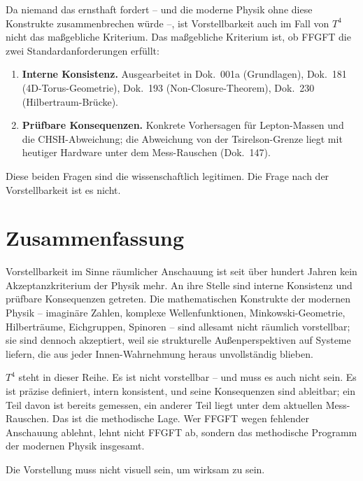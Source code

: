 Da niemand das ernsthaft fordert -- und die moderne Physik ohne diese
Konstrukte zusammenbrechen würde --, ist Vorstellbarkeit auch im Fall
von $T^4$ nicht das maßgebliche Kriterium. Das maßgebliche Kriterium
ist, ob FFGFT die zwei Standardanforderungen erfüllt:

\begin{enumerate}[leftmargin=2em,itemsep=2pt,topsep=2pt]
  \item \textbf{Interne Konsistenz.} Ausgearbeitet in
        Dok.~001a (Grundlagen), Dok.~181 (4D-Torus-Geometrie),
        Dok.~193 (Non-Closure-Theorem), Dok.~230
        (Hilbertraum-Brücke).
  \item \textbf{Prüfbare Konsequenzen.} Konkrete Vorhersagen für
        Lepton-Massen und die CHSH-Abweichung; die Abweichung von der
        Tsirelson-Grenze liegt mit heutiger Hardware unter dem
        Mess-Rauschen (Dok.~147).
\end{enumerate}

Diese beiden Fragen sind die wissenschaftlich legitimen. Die Frage
nach der Vorstellbarkeit ist es nicht.

\section{Zusammenfassung}

Vorstellbarkeit im Sinne räumlicher Anschauung ist seit über hundert
Jahren kein Akzeptanzkriterium der Physik mehr. An ihre Stelle sind
interne Konsistenz und prüfbare Konsequenzen getreten. Die
mathematischen Konstrukte der modernen Physik -- imaginäre Zahlen,
komplexe Wellenfunktionen, Minkowski-Geometrie, Hilberträume,
Eichgruppen, Spinoren -- sind allesamt nicht räumlich vorstellbar;
sie sind dennoch akzeptiert, weil sie strukturelle Außenperspektiven
auf Systeme liefern, die aus jeder Innen-Wahrnehmung heraus
unvollständig blieben.

$T^4$ steht in dieser Reihe. Es ist nicht vorstellbar -- und muss es
auch nicht sein. Es ist präzise definiert, intern konsistent, und
seine Konsequenzen sind ableitbar; ein Teil davon ist bereits
gemessen, ein anderer Teil liegt unter dem aktuellen Mess-Rauschen.
Das ist die methodische Lage. Wer FFGFT wegen fehlender Anschauung
ablehnt, lehnt nicht FFGFT ab, sondern das methodische Programm der
modernen Physik insgesamt.

Die Vorstellung muss nicht visuell sein, um wirksam zu sein.



